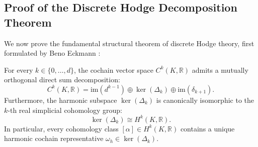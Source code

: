 \subsection{Proof of the Discrete Hodge Decomposition Theorem}
\label{subsec:hodge_decomposition_proof}

We now prove the fundamental structural theorem of discrete Hodge theory, first formulated by Beno Eckmann \cite{Eckmann1944}:

\begin{theorem}
\label{thm:discrete_hodge_decomp}
For every $k \in \{0, \dots, d\}$, the cochain vector space $C^k(K, \mathbb{R})$ admits a mutually orthogonal direct sum decomposition:
\begin{equation}
\label{eq:hodge_decomposition}
C^k(K, \mathbb{R}) = \mathrm{im}(d^{k-1}) \oplus \ker(\Delta_k) \oplus \mathrm{im}(\delta_{k+1}).
\end{equation}
Furthermore, the harmonic subspace $\ker(\Delta_k)$ is canonically isomorphic to the $k$-th real simplicial cohomology group:
\begin{equation}
\label{eq:harmonic_cohomology_iso}
\ker(\Delta_k) \cong H^k(K, \mathbb{R}).
\end{equation}
In particular, every cohomology class $[\alpha] \in H^k(K, \mathbb{R})$ contains a unique harmonic cochain representative $\omega_h \in \ker(\Delta_k)$.
\end{theorem}

